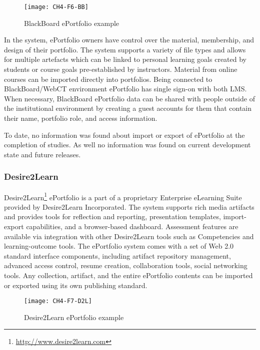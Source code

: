 \begin{figure}[htb]
\centering
\texttt{[image: CH4-F6-BB]}
\caption[BlackBoard ePortfolio example]{BlackBoard ePortfolio example}
\label{fig:bbep}
\end{figure}

In the system, ePortfolio owners have control over the material, membership, and
design of their portfolio. The system supports a variety of file types and
allows for multiple artefacts which can be linked to personal learning goals
created by students or course goals pre-established by instructors. Material
from online courses can be imported directly into portfolios. Being connected to
BlackBoard/WebCT environment ePortfolio has single sign-on with both LMS. When
necessary, BlackBoard ePortfolio data can be shared with people outside of the
institutional environment by creating a guest accounts for them that contain
their name, portfolio role, and access information.

To date, no information was found about import or export of ePortfolio at the
completion of studies. As well no information was found on current development
state and future releases.

\subsubsection{Desire2Learn}
Desire2Learn\footnote{\url{http://www.desire2learn.com}} ePortfolio is a part of
a proprietary Enterprise eLearning Suite provided by Desire2Learn Incorporated.
The system supports rich media artifacts and provides tools for reflection and
reporting, presentation templates, import-export capabilities, and a
browser-based dashboard. Assessment features are available via integration with
other Desire2Learn tools such as Competencies and learning-outcome tools. The
ePortfolio system comes with a set of Web 2.0 standard interface components,
including artifact repository management, advanced access control, resume
creation, collaboration tools, social networking tools. Any collection,
artifact, and the entire ePortfolio contents can be imported or exported using
its own publishing standard.

\begin{figure}[htb]
\centering
\texttt{[image: CH4-F7-D2L]}
\caption[Desire2Learn ePortfolio example]{Desire2Learn ePortfolio example
\citep{Desire2LearnIncorporated2011}}
\label{fig:d2ep}
\end{figure}

